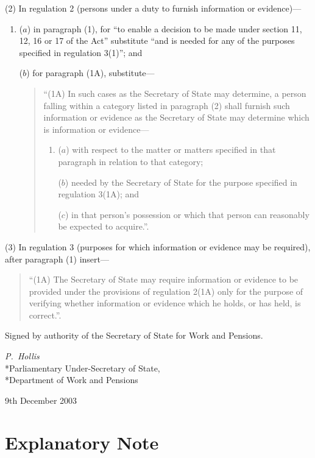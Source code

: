 \documentclass[12pt,a4paper]{article}
\begin{document}
(2) In regulation 2 (persons under a duty to furnish information or evidence)—
\begin{enumerate}\item[]
($a$) in paragraph (1), for “to enable a decision to be made under section 11, 12, 16 or 17 of the Act” substitute “and is needed for any of the purposes specified in regulation 3(1)”; and

($b$) for paragraph (1A), substitute—
\begin{quotation}
“(1A) In such cases as the Secretary of State may determine, a person falling within a category listed in paragraph (2) shall furnish such information or evidence as the Secretary of State may determine which is information or evidence—
\begin{enumerate}\item[]
($a$) with respect to the matter or matters specified in that paragraph in relation to that category;

($b$) needed by the Secretary of State for the purpose specified in regulation 3(1A); and

($c$) in that person’s possession or which that person can reasonably be expected to acquire.”.
\end{enumerate}
\end{quotation}
\end{enumerate}

(3) In regulation 3 (purposes for which information or evidence may be required), after paragraph (1) insert—
\begin{quotation}
“(1A) The Secretary of State may require information or evidence to be provided under the provisions of regulation 2(1A) only for the purpose of verifying whether information or evidence which he holds, or has held, is correct.”.
\end{quotation}

\bigskip

Signed 
by authority of the Secretary of State for Work and Pensions.

{\raggedleft
\emph{P.~Hollis}\\*Parliamentary Under-Secretary of State,\\*Department of Work and Pensions

}


9th December 2003

\small

\part{Explanatory Note}
\end{document}
